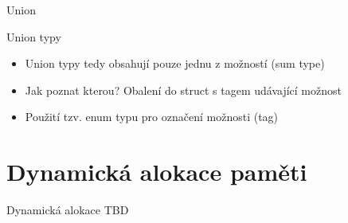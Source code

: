 \documentclass[9pt]{beamer}
\begin{document}
\begin{frame}{Union}
    \begin{block}{Union typy}
        \begin{itemize}
            \item Union typy tedy obsahují pouze jednu z možností (sum type)
            \item Jak poznat kterou? Obalení do struct s tagem udávající možnost
            \item Použití tzv. enum typu pro označení možnosti (tag)
        \end{itemize}
    \end{block}
\end{frame}

\section{Dynamická alokace paměti}

\begin{frame}{Dynamická alokace}
    TBD
\end{frame}
\end{document}
